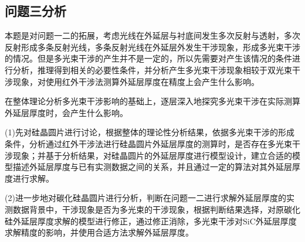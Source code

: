 \documentclass[UTF8]{ctexart}
\begin{document}
\subsection{问题三分析}
本题是对问题一二的拓展，考虑光线在外延层与衬底间发生多次反射与透射，多次反射形成多条反射光线，多条反射光线在外延层外发生干涉现象，形成多光束干涉的情况。但是多光束干涉的产生并不是一定的，所以先需要对产生该情况的条件进行分析，推理得到相关的必要性条件，并分析产生多光束干涉现象相较于双光束干涉现象，对使用红外干涉法测算外延层厚度在精度上会产生什么影响。\par 
在整体理论分析多光束干涉影响的基础上，逐层深入地探究多光束干涉在实际测算外延层厚度时，会产生什么影响。\par 
(1)先对硅晶圆片进行讨论，根据整体的理论性分析结果，依据多光束干涉的形成条件，分析通过红外干涉法进行硅晶圆片外延层厚度的测算时，是否存在多光束干涉现象；并基于分析结果，对硅晶圆片的外延层厚度进行模型设计，建立合适的模型描述外延层厚度与已有实测数据之间的关系，并且通过一定的算法对其外延层厚度进行求解。\par 
(2)进一步地对碳化硅晶圆片进行分析，判断在问题一二进行求解外延层厚度的实测数据背景中，干涉现象是否为多光束的干涉现象，根据判断结果选择，对原碳化硅外延层厚度求解的模型进行修正，通过修正消除，多光束干涉对SiC外延层厚度求解精度的影响，并使用合适方法求解外延层厚度。\par 
\newpage 
\end{document}
